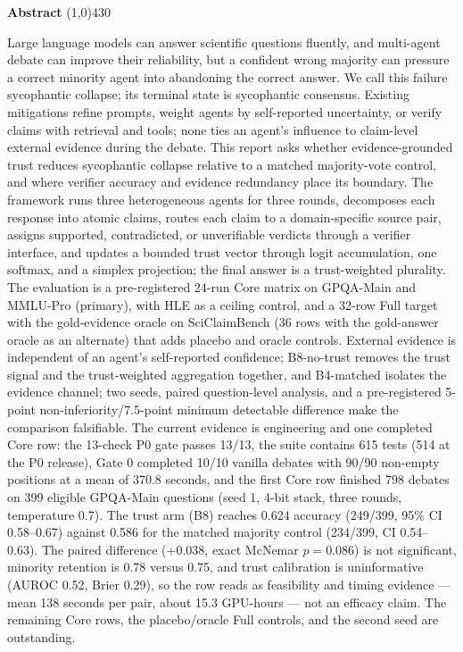 \setlength{\headheight}{14pt}
\begin{center}
	{\huge \bf Abstract}
	\line(1,0){430}
\end{center}


Large language models can answer scientific questions fluently, and multi-agent debate can improve their reliability, but a confident wrong majority can pressure a correct minority agent into abandoning the correct answer. We call this failure sycophantic collapse; its terminal state is sycophantic consensus. Existing mitigations refine prompts, weight agents by self-reported uncertainty, or verify claims with retrieval and tools; none ties an agent's influence to claim-level external evidence during the debate. This report asks whether evidence-grounded trust reduces sycophantic collapse relative to a matched majority-vote control, and where verifier accuracy and evidence redundancy place its boundary. The framework runs three heterogeneous agents for three rounds, decomposes each response into atomic claims, routes each claim to a domain-specific source pair, assigns supported, contradicted, or unverifiable verdicts through a verifier interface, and updates a bounded trust vector through logit accumulation, one softmax, and a simplex projection; the final answer is a trust-weighted plurality. The evaluation is a pre-registered 24-run Core matrix on GPQA-Main and MMLU-Pro (primary), with HLE as a ceiling control, and a 32-row Full target with the gold-evidence oracle on SciClaimBench (36 rows with the gold-answer oracle as an alternate) that adds placebo and oracle controls. External evidence is independent of an agent's self-reported confidence; B8-no-trust removes the trust signal and the trust-weighted aggregation together, and B4-matched isolates the evidence channel; two seeds, paired question-level analysis, and a pre-registered 5-point non-inferiority/7.5-point minimum detectable difference make the comparison falsifiable. The current evidence is engineering and one completed Core row: the 13-check P0 gate passes 13/13, the suite contains 615 tests (514 at the P0 release), Gate 0 completed 10/10 vanilla debates with 90/90 non-empty positions at a mean of 370.8 seconds, and the first Core row finished 798 debates on 399 eligible GPQA-Main questions (seed 1, 4-bit stack, three rounds, temperature 0.7). The trust arm (B8) reaches 0.624 accuracy (249/399, 95\% CI 0.58--0.67) against 0.586 for the matched majority control (234/399, CI 0.54--0.63). The paired difference (+0.038, exact McNemar $p=0.086$) is not significant, minority retention is 0.78 versus 0.75, and trust calibration is uninformative (AUROC 0.52, Brier 0.29), so the row reads as feasibility and timing evidence --- mean 138 seconds per pair, about 15.3 GPU-hours --- not an efficacy claim. The remaining Core rows, the placebo/oracle Full controls, and the second seed are outstanding.

\clearpage
\setlength{\headheight}{12pt}
